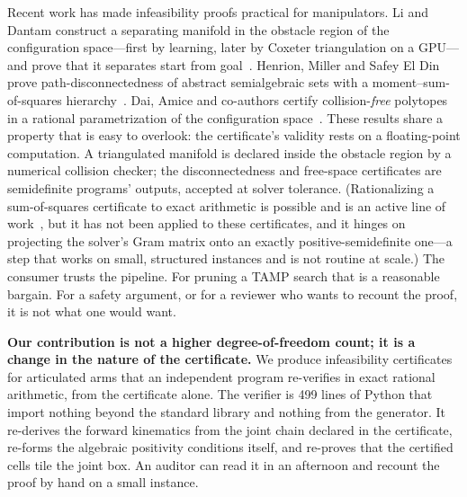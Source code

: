 \documentclass[10pt,twocolumn,letterpaper]{article}
\begin{document}
Recent work has made infeasibility proofs practical for manipulators. Li and Dantam construct a separating manifold in the obstacle region of the configuration space---first by learning, later by Coxeter triangulation on a GPU---and prove that it separates start from goal~\cite{li2021rss,li2023ijrr,li2023ral,li2024gpu}. Henrion, Miller and Safey El Din prove path-disconnectedness of abstract semialgebraic sets with a moment--sum-of-squares hierarchy~\cite{henrion2024}. Dai, Amice and co-authors certify collision-\emph{free} polytopes in a rational parametrization of the configuration space~\cite{dai2024ciris}. These results share a property that is easy to overlook: the certificate's validity rests on a floating-point computation. A triangulated manifold is declared inside the obstacle region by a numerical collision checker; the disconnectedness and free-space certificates are semidefinite programs' outputs, accepted at solver tolerance. (Rationalizing a sum-of-squares certificate to exact arithmetic is possible and is an active line of work~\cite{peyrl2008,magron2018realcertify,henrion2025notsos}, but it has not been applied to these certificates, and it hinges on projecting the solver's Gram matrix onto an exactly positive-semidefinite one---a step that works on small, structured instances and is not routine at scale.) The consumer trusts the pipeline. For pruning a TAMP search that is a reasonable bargain. For a safety argument, or for a reviewer who wants to recount the proof, it is not what one would want.

\textbf{Our contribution is not a higher degree-of-freedom count; it is a change in the nature of the certificate.} We produce infeasibility certificates for articulated arms that an independent program re-verifies in exact rational arithmetic, from the certificate alone. The verifier is 499 lines of Python that import nothing beyond the standard library and nothing from the generator. It re-derives the forward kinematics from the joint chain declared in the certificate, re-forms the algebraic positivity conditions itself, and re-proves that the certified cells tile the joint box. An auditor can read it in an afternoon and recount the proof by hand on a small instance.
\end{document}
